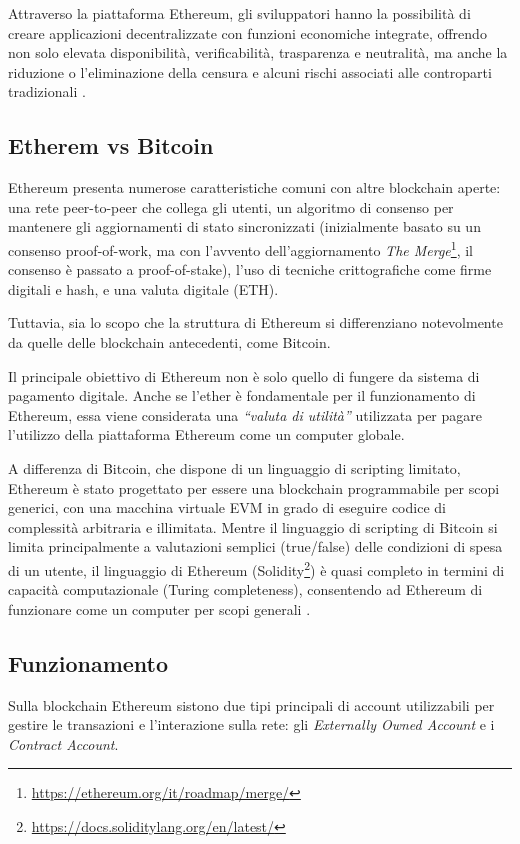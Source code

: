 Attraverso la piattaforma Ethereum, gli sviluppatori hanno la possibilità di creare applicazioni decentralizzate con funzioni 
economiche integrate, offrendo non solo elevata disponibilità, verificabilità, trasparenza e neutralità, ma anche la riduzione 
o l’eliminazione della censura e alcuni rischi associati alle controparti tradizionali \cite{antonopoulos2018mastering}.

\subsection{Etherem vs Bitcoin}\label{subsec:ethVSbtc}
Ethereum presenta numerose caratteristiche comuni con altre blockchain aperte: una rete peer-to-peer che collega gli utenti, 
un algoritmo di consenso per mantenere gli aggiornamenti di stato sincronizzati (inizialmente basato su un consenso proof-of-work, 
ma con l’avvento dell’aggiornamento \textit{The Merge}\footnote{\url{https://ethereum.org/it/roadmap/merge/}}, il consenso è passato 
a proof-of-stake), l’uso di tecniche crittografiche come firme digitali e hash, e una valuta digitale (ETH).

Tuttavia, sia lo scopo che la struttura di Ethereum si differenziano notevolmente da quelle delle blockchain antecedenti, come Bitcoin.

Il principale obiettivo di Ethereum non è solo quello di fungere da sistema di pagamento digitale. Anche se l’ether è fondamentale 
per il funzionamento di Ethereum, essa viene considerata una \textit{“valuta di utilità”} utilizzata per pagare l’utilizzo della piattaforma 
Ethereum come un computer globale.

A differenza di Bitcoin, che dispone di un linguaggio di scripting limitato, Ethereum è stato progettato per essere una blockchain 
programmabile per scopi generici, con una macchina virtuale EVM in grado di eseguire codice di complessità arbitraria e illimitata. 
Mentre il linguaggio di scripting di Bitcoin si limita principalmente a valutazioni semplici (true/false) delle condizioni di spesa 
di un utente, il linguaggio di Ethereum (Solidity\footnote{\url{https://docs.soliditylang.org/en/latest/}}) è quasi completo in 
termini di capacità computazionale (Turing completeness), consentendo ad Ethereum di funzionare come un computer per scopi 
generali \cite{antonopoulos2018mastering}.

\subsection{Funzionamento}\label{subsec:funzionamentoETH}
Sulla blockchain Ethereum sistono due tipi principali di account utilizzabili per gestire le transazioni e l’interazione sulla rete: 
gli \textit{Externally Owned Account} e i \textit{Contract Account}.

